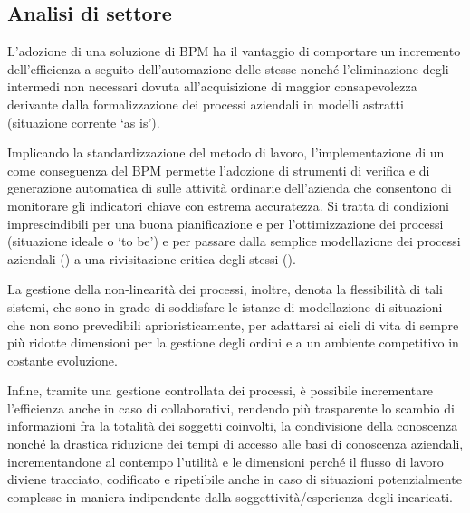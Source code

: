 \subsection{Analisi di settore}

L'adozione di una soluzione di BPM ha il vantaggio di comportare un incremento dell'efficienza a seguito dell'automazione delle stesse nonché l'eliminazione degli  intermedi non necessari dovuta all'acquisizione di maggior consapevolezza derivante dalla formalizzazione dei processi aziendali in modelli astratti (situazione corrente `as is').

Implicando la standardizzazione del metodo di lavoro, l'implementazione di un  come conseguenza del BPM permette l'adozione di strumenti di verifica e di generazione automatica di  sulle attività ordinarie dell'azienda che consentono di monitorare gli indicatori chiave con estrema accuratezza. Si tratta di condizioni imprescindibili per una buona pianificazione e per l'ottimizzazione dei processi (situazione ideale o `to be') e per passare dalla semplice modellazione dei processi aziendali (\bsn {}) a una rivisitazione critica degli stessi (\bsn {}).

La gestione della non-linearità dei processi, inoltre, denota la flessibilità di tali sistemi, che sono in grado di soddisfare le istanze di modellazione di situazioni che non sono prevedibili aprioristicamente, per adattarsi ai cicli di vita di sempre più ridotte dimensioni per la gestione degli ordini e a un ambiente competitivo in costante evoluzione.

Infine, tramite una gestione controllata dei processi, è possibile incrementare l'efficienza anche in caso di  collaborativi, rendendo più trasparente lo scambio di informazioni fra la totalità dei soggetti coinvolti, la condivisione della conoscenza nonché la drastica riduzione dei tempi di accesso alle basi di conoscenza aziendali, incrementandone al contempo l'utilità e le dimensioni perché il flusso di lavoro diviene tracciato, codificato e ripetibile anche in caso di situazioni potenzialmente complesse in maniera indipendente dalla soggettività/esperienza degli incaricati.

